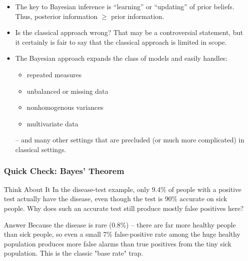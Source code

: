 \begin{frame}

\begin{itemize}\setlength{\itemsep}{0.5cm}
 \item The key to Bayesian inference is ``learning'' or ``updating'' of prior beliefs. Thus, posterior information $\geq$ prior information.

 \item Is the classical approach wrong? That may be a controversial statement, but it certainly is fair to say that the classical approach is limited in scope.

 \item The Bayesian approach expands the class of models and easily handles:
	\begin{itemize}
	\item repeated measures
	\item unbalanced or missing data
	\item nonhomogenous variances
	\item multivariate data
	\end{itemize}
	-- and many other settings that are precluded (or much more complicated) in classical settings.
\end{itemize}

\end{frame}

\begin{frame}[fragile]\frametitle{Quick Check: Bayes' Theorem}
\begin{block}{Think About It}
In the disease-test example, only 9.4\% of people with a positive test actually have the disease, even though the test is 90\% accurate on sick people. Why does such an accurate test still produce mostly false positives here?
\end{block}
\pause
\begin{block}{Answer}
Because the disease is rare (0.8\%) -- there are far more healthy people than sick people, so even a small 7\% false-positive rate among the huge healthy population produces more false alarms than true positives from the tiny sick population. This is the classic "base rate" trap.
\end{block}
\end{frame}

